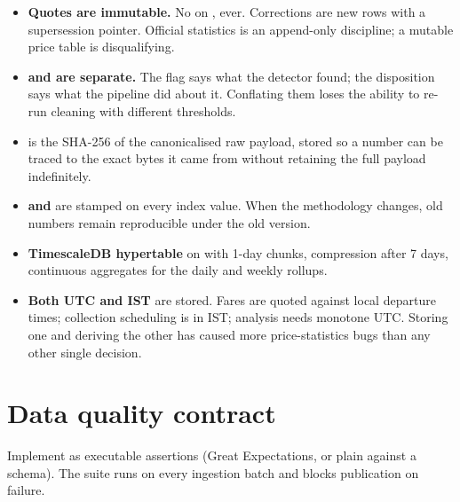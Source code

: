 \begin{itemize}
\item \textbf{Quotes are immutable.} No  on , ever.
Corrections are new rows with a supersession pointer. Official statistics is an
append-only discipline; a mutable price table is disqualifying.
\item \textbf{ and  are separate.} The flag says what
the detector found; the disposition says what the pipeline did about it. Conflating them
loses the ability to re-run cleaning with different thresholds.
\item \textbf{} is the SHA-256 of the canonicalised raw payload, stored so a
number can be traced to the exact bytes it came from without retaining the full payload
indefinitely.
\item \textbf{ and } are stamped on every index
value. When the methodology changes, old numbers remain reproducible under the old version.
\item \textbf{TimescaleDB hypertable} on  with 1-day chunks,
compression after 7 days, continuous aggregates for the daily and weekly rollups.
\item \textbf{Both UTC and IST} are stored. Fares are quoted against local departure times;
collection scheduling is in IST; analysis needs monotone UTC. Storing one and deriving the
other has caused more price-statistics bugs than any other single decision.
\end{itemize}

\section{Data quality contract}

Implement as executable assertions (Great Expectations, or plain  against a
 schema). The suite runs on every ingestion batch and blocks publication on
failure.

